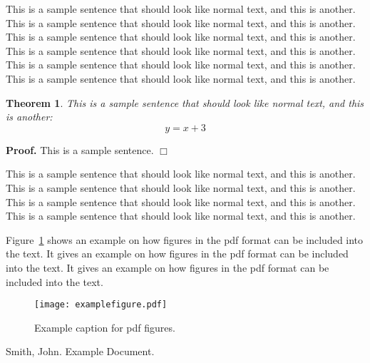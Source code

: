 \documentclass[officiallayout]{tktla}
\newtheorem{theorem}{Theorem}[chapter]
\newenvironment{proof}{\noindent\textbf{Proof.} }{$\Box$}
\begin{document}
This is a sample sentence that should look like normal text, and this
is another. This is a sample sentence that should look like normal
text, and this is another. This is a sample sentence that should look
like normal text, and this is another. This is a sample sentence that
should look like normal text, and this is another. This is a sample
sentence that should look like normal text, and this is another. This
is a sample sentence that should look like normal text, and this is
another.

\begin{theorem}
This is a sample sentence that should look like normal text,
and this is another:
\[ y = x+3 \]
\end{theorem}

\begin{proof}
This is a sample sentence.
\end{proof}

This is a sample sentence that should look like normal text, and this
is another. This is a sample sentence that should look like normal
text, and this is another. This is a sample sentence that should look
like normal text, and this is another. This is a sample sentence that
should look like normal text, and this is another.

Figure~\ref{fig:examplefigure} shows an example on how figures in the 
pdf format can be included into the text. It gives an example on how 
figures in the pdf format can be included into the text. It gives 
an example on how figures in the pdf format can be included into the text.

\begin{figure}
    \centering
    \texttt{[image: examplefigure.pdf]}
    \caption{Example caption for pdf figures.}
\label{fig:examplefigure}
\end{figure}

\begin{thebibliography}{00}
\item Smith, John. Example Document.
\end{thebibliography}
\end{document}
